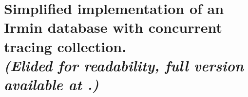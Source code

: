 \section
    [Simplified implementation of an Irmin database with concurrent tracing collection.]
    {Simplified implementation of an Irmin database with concurrent tracing collection.\\
    \textit{(Elided for readability, full version available at \cite{irmin-toy-database}.)}}
\label{app:concurrent-modular-tracing}

\inputminted{ocaml}{appendices/sources/database.ml}